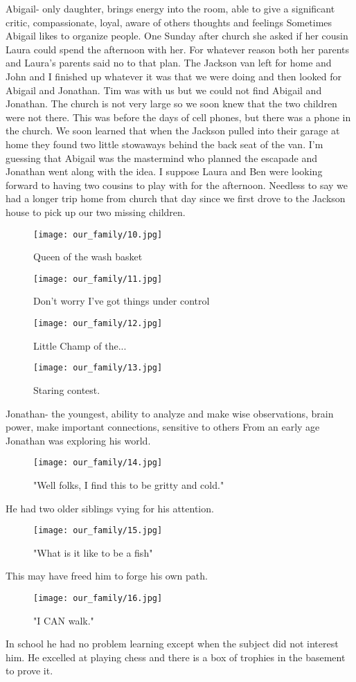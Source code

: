 Abigail- only daughter, brings energy into the room, able to give a significant critic, compassionate, loyal, aware of others thoughts and feelings
Sometimes Abigail likes to organize people.
One Sunday after church she asked if her cousin Laura could spend the afternoon with her.
For whatever reason both her parents and Laura's parents said no to that plan.
The Jackson van left for home and John and I finished up whatever it was that we were doing and then looked for Abigail and Jonathan.
Tim was with us but we could not find Abigail and Jonathan.
The church is not very large so we soon knew that the two children were not there.
This was before the days of cell phones, but there was a phone in the church.
We soon learned that when the Jackson pulled into their garage at home they found two little stowaways behind the back seat of the van.
I'm guessing that Abigail was the mastermind who planned the escapade and Jonathan went along with the idea.
I suppose Laura and Ben were looking forward to having two cousins to play with for the afternoon.
Needless to say we had a longer trip home from church that day since we first drove to the Jackson house to pick up our two missing children.
\begin{figure}
\centering
\texttt{[image: our\_family/10.jpg]}
\caption{
Queen of the wash basket
}
\end{figure}

\begin{figure}
\centering
\texttt{[image: our\_family/11.jpg]}
\caption{
Don't worry I've got things under control
}
\end{figure}

\begin{figure}
\centering
\texttt{[image: our\_family/12.jpg]}
\caption{
Little Champ of the...
}
\end{figure}

\begin{figure}
\centering
\texttt{[image: our\_family/13.jpg]}
\caption{
Staring contest.
}
\end{figure}

Jonathan- the youngest, ability to analyze and make wise observations, brain power, make important connections, sensitive to others
From an early age Jonathan was exploring his world. 
\begin{figure}
\centering
\texttt{[image: our\_family/14.jpg]}
\caption{
"Well folks, I find this to be gritty and cold." 
}
\end{figure}
He had two older siblings vying for his attention.
\begin{figure}
\centering
\texttt{[image: our\_family/15.jpg]}
\caption{
"What is it like to be a fish"
}
\end{figure}
This may have freed him to forge his own path. 
\begin{figure}
\centering
\texttt{[image: our\_family/16.jpg]}
\caption{
"I CAN walk."
}
\end{figure}
In school he had no problem learning except when the subject did not interest him.
He excelled at playing chess and there is a box of trophies in the basement to prove it.

